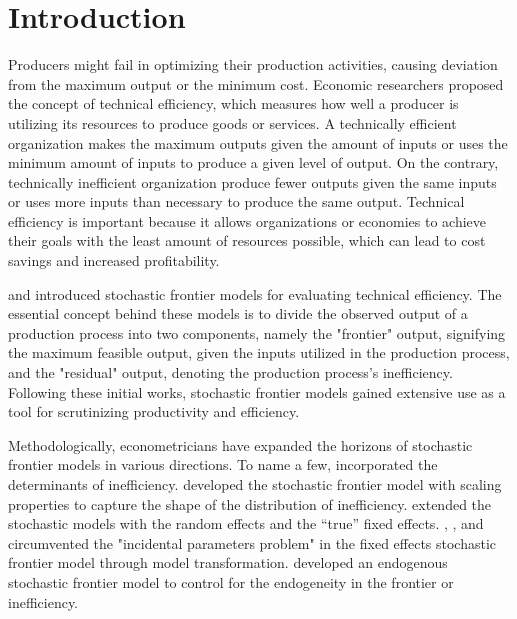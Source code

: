 
\section{Introduction}\label{sec_intro}


Producers might fail in optimizing their production activities, causing deviation from the maximum output or the minimum cost. Economic researchers proposed the concept of technical efficiency, which measures how well a producer is utilizing its resources to produce goods or services. A technically efficient organization makes the maximum outputs given the amount of inputs or uses the minimum amount of inputs to produce a given level of output. On the contrary, technically inefficient organization produce fewer outputs given the same inputs or uses more inputs than necessary to produce the same output. Technical efficiency is important because it allows organizations or economies to achieve their goals with the least amount of resources possible, which can lead to cost savings and increased profitability. 

\cite{aignerFormulationEstimationStochastic1977} and \cite{meeusen1977efficiency} introduced stochastic frontier models for evaluating technical efficiency. The essential concept behind these models is to divide the observed output of a production process into two components, namely the "frontier" output, signifying the maximum feasible output, given the inputs utilized in the production process, and the "residual" output, denoting the production process's inefficiency. Following these initial works, stochastic frontier models gained extensive use as a tool for scrutinizing productivity and efficiency. 

Methodologically, econometricians have expanded the horizons of stochastic frontier models in various directions. To name a few, \cite{battese1995model} incorporated the determinants of inefficiency. \cite{wang2003stochastic} developed the stochastic frontier model with scaling properties to capture the shape of the distribution of inefficiency. \cite{greene2005fixed} extended the stochastic models with the random effects and the “true” fixed effects. \cite{belotti2018consistent}, \cite{chen2014consistent}, and \cite{ wang2010estimating} circumvented the "incidental parameters problem" in the fixed effects stochastic frontier model through model transformation. \cite{karakaplan2017handling} developed an endogenous stochastic frontier model to control for the endogeneity in the frontier or inefficiency. 


